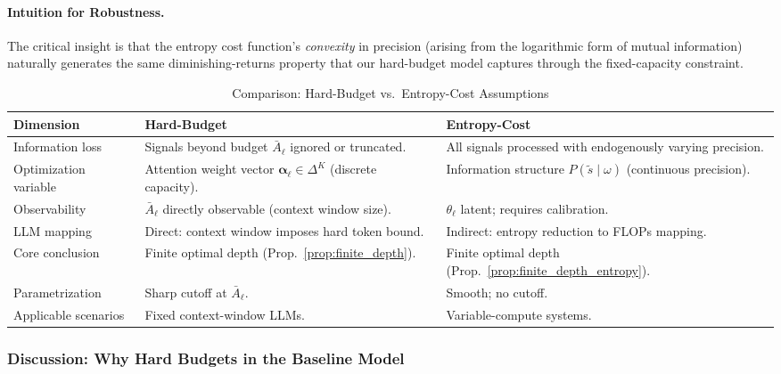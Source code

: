 \paragraph{Intuition for Robustness.} The critical insight is that the entropy cost function's \emph{convexity} in precision (arising from the logarithmic form of mutual information) naturally generates the same diminishing-returns property that our hard-budget model captures through the fixed-capacity constraint.

\begin{table}[htbp]
\centering
\footnotesize
\setlength{\tabcolsep}{3pt}
\caption{Comparison: Hard-Budget vs.~Entropy-Cost Assumptions}
\label{tab:assumption_comparison}
\begin{tabular}{@{}>{\raggedright\arraybackslash}p{2.8cm}>{\raggedright\arraybackslash}p{5.6cm}>{\raggedright\arraybackslash}p{5.6cm}@{}}
\toprule
\textbf{Dimension} & \textbf{Hard-Budget} & \textbf{Entropy-Cost} \\
\midrule
Information loss & Signals beyond budget $\bar{A}_\ell$ ignored or truncated. & All signals processed with endogenously varying precision. \\
Optimization variable & Attention weight vector $\boldsymbol{\alpha}_\ell \in \Delta^{K}$ (discrete capacity). & Information structure $P(\tilde{s} \mid \omega)$ (continuous precision). \\
Observability & $\bar{A}_\ell$ directly observable (context window size). & $\theta_\ell$ latent; requires calibration. \\
LLM mapping & Direct: context window imposes hard token bound. & Indirect: entropy reduction to FLOPs mapping. \\
Core conclusion & Finite optimal depth (Prop.~\ref{prop:finite_depth}). & Finite optimal depth (Prop.~\ref{prop:finite_depth_entropy}). \\
Parametrization & Sharp cutoff at $\bar{A}_\ell$. & Smooth; no cutoff. \\
Applicable scenarios & Fixed context-window LLMs. & Variable-compute systems. \\
\bottomrule
\end{tabular}
\end{table}

\subsubsection{Discussion: Why Hard Budgets in the Baseline Model}

